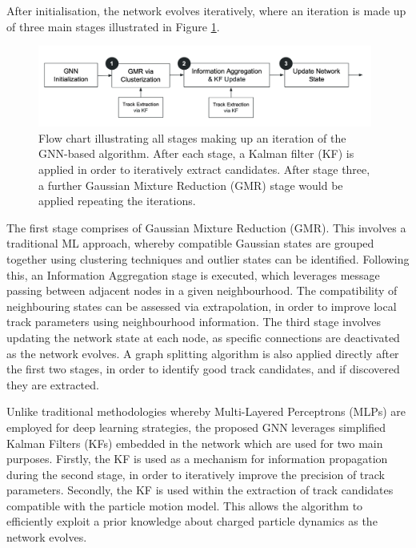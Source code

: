 After initialisation, the network evolves iteratively, where an iteration is made up of three main stages illustrated in Figure \ref{fig:flowchart}. 

\begin{figure}[htbp]
    \centering
    \includegraphics[width=0.98\textwidth]{images/5-gnn-algorithm/gnn-workflow.png}
    \caption{Flow chart illustrating all stages making up an iteration of the GNN-based algorithm. After each stage, a Kalman filter (KF) is applied in order to iteratively extract candidates. After stage three, a further Gaussian Mixture Reduction (GMR) stage would be applied repeating the iterations.}
    \label{fig:flowchart}%
\end{figure}


The first stage comprises of Gaussian Mixture Reduction (GMR). This involves a traditional ML approach, whereby compatible Gaussian states are grouped together using clustering techniques and outlier states can be identified. Following this, an Information Aggregation stage is executed, which leverages message passing between adjacent nodes in a given neighbourhood. The compatibility of neighbouring states can be assessed via extrapolation, in order to improve local track parameters using neighbourhood information. The third stage involves updating the network state at each node, as specific connections are deactivated as the network evolves. A graph splitting algorithm is also applied directly after the first two stages, in order to identify good track candidates, and if discovered they are extracted. 

Unlike traditional methodologies whereby Multi-Layered Perceptrons (MLPs) are employed for deep learning strategies, the proposed GNN leverages simplified Kalman Filters (KFs) embedded in the network which are used for two main purposes. Firstly, the KF is used as a mechanism for information propagation during the second stage, in order to iteratively improve the precision of track parameters. Secondly, the KF is used within the extraction of track candidates compatible with the particle motion model. This allows the algorithm to efficiently exploit a prior knowledge about charged particle dynamics as the network evolves.

